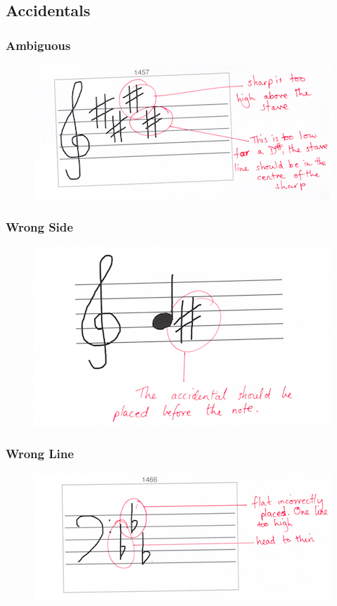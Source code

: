\subsection{Accidentals}

\subsubsection{Ambiguous}\label{sec:tf-accidental-ambiguous}

\begin{figure}[H]
  \centering
  \includegraphics[width=.6\linewidth]{gfx/teacher-notes/mistake-accidental-ambiguous.png}
  \caption{}
\end{figure}

\subsubsection{Wrong Side}\label{sec:tf-accidental-wrong-side}

\begin{figure}[H]
  \centering
  \includegraphics[width=.6\linewidth]{gfx/teacher-notes/mistake-accidental-wrong-side.png}
  \caption{}
\end{figure}

\subsubsection{Wrong Line}\label{sec:tf-accidental-wrong-line}

\begin{figure}[H]
  \centering
  \includegraphics[width=.6\linewidth]{gfx/teacher-notes/mistake-accidental-wrong-line.png}
  \caption{}
\end{figure}

